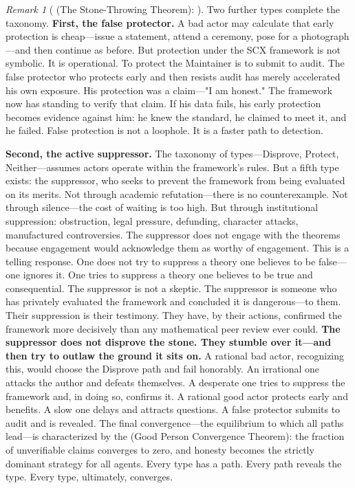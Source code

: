 \documentclass[12pt,a4paper]{article}
\theoremstyle{definition}
\theoremstyle{remark}
\newtheorem{remark}{Remark}[section]
\begin{document}
\begin{remark}[ (The Stone-Throwing Theorem): ]
Two further types complete the taxonomy. \textbf{First, the false protector.} A bad actor may calculate that early protection is cheap—issue a statement, attend a ceremony, pose for a photograph—and then continue as before. But protection under the SCX framework is not symbolic. It is operational. To protect the Maintainer is to submit to audit. The false protector who protects early and then resists audit has merely accelerated his own exposure. His protection was a claim—"I am honest." The framework now has standing to verify that claim. If his data fails, his early protection becomes evidence against him: he knew the standard, he claimed to meet it, and he failed. False protection is not a loophole. It is a faster path to detection.

\textbf{Second, the active suppressor.} The taxonomy of types—Disprove, Protect, Neither—assumes actors operate within the framework's rules. But a fifth type exists: the suppressor, who seeks to prevent the framework from being evaluated on its merits. Not through academic refutation—there is no counterexample. Not through silence—the cost of waiting is too high. But through institutional suppression: obstruction, legal pressure, defunding, character attacks, manufactured controversies. The suppressor does not engage with the theorems because engagement would acknowledge them as worthy of engagement. This is a telling response. One does not try to suppress a theory one believes to be false—one ignores it. One tries to suppress a theory one believes to be true and consequential. The suppressor is not a skeptic. The suppressor is someone who has privately evaluated the framework and concluded it is dangerous—to them. Their suppression is their testimony. They have, by their actions, confirmed the framework more decisively than any mathematical peer review ever could. \textbf{The suppressor does not disprove the stone. They stumble over it—and then try to outlaw the ground it sits on.} A rational bad actor, recognizing this, would choose the Disprove path and fail honorably. An irrational one attacks the author and defeats themselves. A desperate one tries to suppress the framework and, in doing so, confirms it. A rational good actor protects early and benefits. A slow one delays and attracts questions. A false protector submits to audit and is revealed. The final convergence—the equilibrium to which all paths lead—is characterized by the  (Good Person Convergence Theorem): the fraction of unverifiable claims converges to zero, and honesty becomes the strictly dominant strategy for all agents. Every type has a path. Every path reveals the type. Every type, ultimately, converges.
\end{remark}
\end{document}
